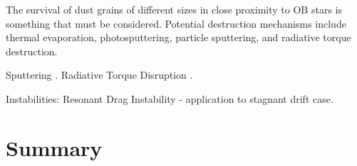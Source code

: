 The survival of dust grains of different sizes in close proximity to
OB stars is something that must be considered.  Potential destruction
mechanisms include thermal evaporation, photosputtering, particle
sputtering, and radiative torque destruction.  

Sputtering
\citep{Draine:2011a}.  Radiative Torque Disruption
\citep{Hoang:2018a}.


Instabilities: Resonant Drag Instability \citep{Squire:2018a, Hopkins:2018a} - application to stagnant drift case. 




\section{Summary}
\label{sec:summary}


